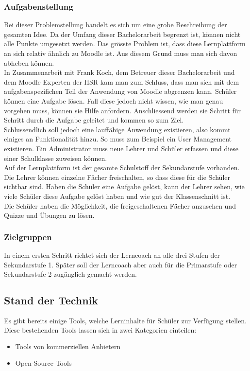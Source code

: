 \subsubsection{Aufgabenstellung}
Bei dieser Problemstellung handelt es sich um eine grobe Beschreibung der gesamten Idee. Da der Umfang dieser Bachelorarbeit begrenzt ist, können nicht alle Punkte umgesetzt werden. Das grösste Problem ist, dass diese Lernplattform an sich relativ ähnlich zu Moodle ist. Aus diesem Grund muss man sich davon abheben können.
\\
In Zusammenarbeit mit Frank Koch, dem Betreuer dieser Bachelorarbeit und dem Moodle Experten der HSR kam man zum Schluss, dass man sich mit dem aufgabenspezifichen Teil der Anwendung von Moodle abgrenzen kann. Schüler können eine Aufgabe lösen. Fall diese jedoch nicht wissen, wie man genau vorgehen muss, können sie Hilfe anfordern. Anschliessend werden sie Schritt für Schritt durch die Aufgabe geleitet und kommen so zum Ziel.
\\
Schlussendlich soll jedoch eine lauffähige Anwendung existieren, also kommt einiges an Funktionalität hinzu. So muss zum Beispiel ein User Management existieren. Ein Administrator muss neue Lehrer und Schüler erfassen und diese einer Schulklasse zuweisen können.
\\
Auf der Lernplattform ist der gesamte Schulstoff der Sekundarstufe vorhanden. Die Lehrer können einzelne Fächer freischalten, so dass diese für die Schüler sichtbar sind. Haben die Schüler eine Aufgabe gelöst, kann der Lehrer sehen, wie viele Schüler diese Aufgabe gelöst haben und wie gut der Klassenschnitt ist.
\\
Die Schüler haben die Möglichkeit, die freigeschaltenen Fächer anzusehen und Quizze und Übungen zu lösen.

\subsubsection{Zielgruppen}
In einem ersten Schritt richtet sich der Lerncoach an alle drei Stufen der Sekundarstufe 1. Später soll der Lerncoach aber auch für die Primarstufe oder Sekundarstufe 2 zugänglich gemacht werden. 

\subsection{Stand der Technik}
Es gibt bereits einige Tools, welche Lerninhalte für Schüler zur Verfügung stellen. Diese bestehenden Tools lassen sich in zwei Kategorien einteilen:
\begin{itemize}
	\item Tools von kommerziellen Anbietern
	\item Open-Source Tools
\end{itemize}

